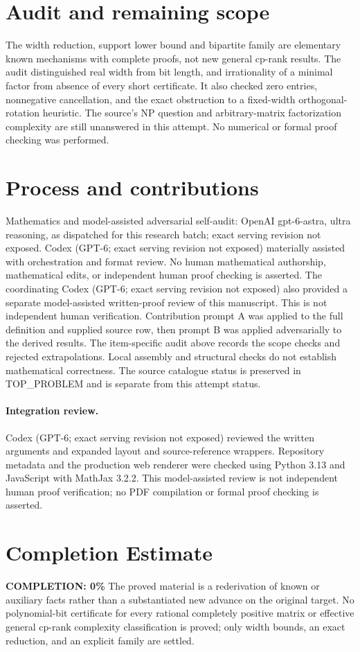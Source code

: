 \documentclass[11pt]{article}
\begin{document}
\section{Audit and remaining scope}
The width reduction, support lower bound and bipartite family are elementary
known mechanisms with complete proofs, not new general cp-rank results.
The audit distinguished real width from bit length, and irrationality of a
minimal factor from absence of every short certificate. It also checked zero
entries, nonnegative cancellation, and the exact obstruction to a fixed-width
orthogonal-rotation heuristic. The source's NP question and arbitrary-matrix
factorization complexity are still unanswered in this attempt. No numerical
or formal proof checking was performed.

\section{Process and contributions}
Mathematics and model-assisted adversarial self-audit: OpenAI gpt-6-astra, ultra reasoning, as dispatched for this research batch; exact serving revision not exposed. Codex (GPT-6; exact serving revision not exposed) materially assisted with orchestration and format review. No human mathematical authorship, mathematical edits, or independent human proof checking is asserted.
The coordinating Codex (GPT-6; exact serving revision not exposed) also provided a separate model-assisted written-proof review of this manuscript. This is not independent human verification.
Contribution prompt A was applied to the full definition and supplied source row, then prompt B was applied adversarially to the derived results. The item-specific audit above records the scope checks and rejected extrapolations. Local assembly and structural checks do not establish mathematical correctness. The source catalogue status is preserved in TOP\_PROBLEM and is separate from this attempt status.
\paragraph{Integration review.} Codex (GPT-6; exact serving revision not exposed) reviewed the written arguments and expanded layout and source-reference wrappers. Repository metadata and the production web renderer were checked using Python 3.13 and JavaScript with MathJax 3.2.2. This model-assisted review is not independent human proof verification; no PDF compilation or formal proof checking is asserted.

\section{Completion Estimate}
\noindent\textbf{COMPLETION: 0\%}
The proved material is a rederivation of known or auxiliary facts rather than a substantiated new advance on the original target. No polynomial-bit certificate for every rational completely positive matrix or effective general cp-rank complexity classification is proved; only width bounds, an exact reduction, and an explicit family are settled.
\end{document}
